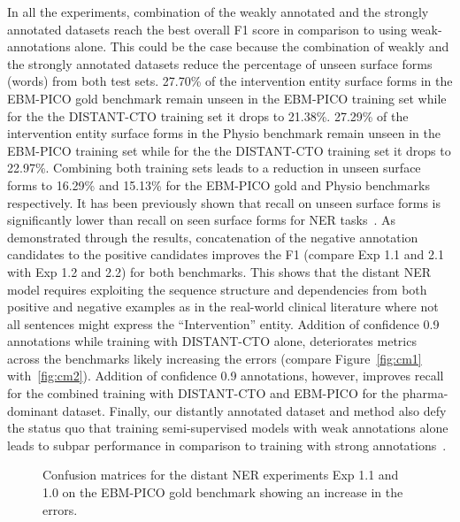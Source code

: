 \documentclass[letterpaper]{article} %
\begin{document}
In all the experiments, combination of the weakly annotated and the strongly annotated datasets reach the best overall F1 score in comparison to using weak-annotations alone.
This could be the case because the combination of weakly and the strongly annotated datasets reduce the percentage of unseen surface forms (words) from both test sets.
27.70\% of the intervention entity surface forms in the EBM-PICO gold benchmark remain unseen in the EBM-PICO training set while for the the DISTANT-CTO training set it drops to 21.38\%.
27.29\% of the intervention entity surface forms in the Physio benchmark remain unseen in the EBM-PICO training set while for the the DISTANT-CTO training set it drops to 22.97\%.
Combining both training sets leads to a reduction in unseen surface forms to 16.29\% and 15.13\% for the EBM-PICO gold and Physio benchmarks respectively.
It has been previously shown that recall on unseen surface forms is significantly lower than recall on seen surface forms for NER tasks~\cite{augenstein2017generalisation}.
As demonstrated through the results, concatenation of the negative annotation candidates to the positive candidates improves the F1 (compare Exp 1.1 and 2.1 with Exp 1.2 and 2.2) for both benchmarks.
This shows that the distant NER model requires exploiting the sequence structure and dependencies from both positive and negative examples as in the real-world clinical literature where not all sentences might express the ``Intervention'' entity.
Addition of confidence 0.9 annotations while training with DISTANT-CTO alone, deteriorates metrics across the benchmarks likely increasing the errors (compare Figure~\ref{fig:cm1} with~\ref{fig:cm2}).
Addition of confidence 0.9 annotations, however, improves recall for the combined training with DISTANT-CTO and EBM-PICO for the pharma-dominant dataset.
Finally, our distantly annotated dataset and method also defy the status quo that training semi-supervised models with weak annotations alone leads to subpar performance in comparison to training with strong annotations~\cite{shang2018learning,jiang2021named}.
%
%
\begin{figure}[!tbp]
  \centering
  \hfill
  \caption{Confusion matrices for the distant NER experiments Exp 1.1 and 1.0 on the EBM-PICO gold benchmark showing an increase in the errors.}
\end{figure}
%
\end{document}
